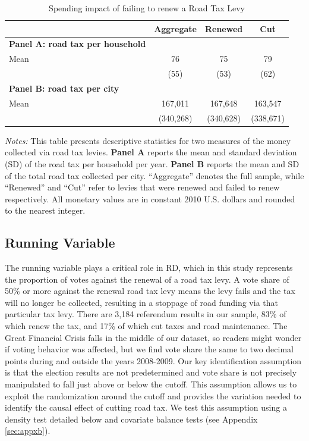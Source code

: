 \begin{table}[H]
    \centering
    \caption{Spending impact of failing to renew a Road Tax Levy}
    \label{tab:levy_stats}
    \begin{threeparttable}
    \begin{tabular}{p{5cm}ccc}
    \hline\hline
    & \textbf{Aggregate} & \textbf{Renewed} & \textbf{Cut} \\
    \hline
    \textbf{Panel A: road tax per household} \\
    Mean & 76 & 75 & 79 \\
       & (55) & (53) & (62) \\
    \hline
    \textbf{Panel B: road tax per city} \\
    Mean & 167,011 & 167,648 & 163,547 \\
       & (340,268) & (340,628) & (338,671) \\
    \hline\hline
    \end{tabular}
    \begin{tablenotes}[flushleft]
      \footnotesize
      \item \textit{Notes:} 
      This table presents descriptive statistics for two measures of the money collected via road tax levies. 
      \textbf{Panel A} reports the mean and standard deviation (SD) of the road tax per household per year. 
      \textbf{Panel B} reports the mean and SD of the total road tax collected per city. 
      “Aggregate” denotes the full sample, while “Renewed” and “Cut” refer to levies that were renewed and failed to renew respectively.
      All monetary values are in constant 2010 U.S. dollars and rounded to the nearest integer.
    \end{tablenotes}
    \end{threeparttable}
\end{table}

\subsection{Running Variable}

The running variable plays a critical role in RD, which in this study represents the proportion of votes against the renewal of a road tax levy. A vote share of 50\% or more against the renewal road tax levy means the levy fails and the tax will no longer be collected, resulting in a stoppage of road funding via that particular tax levy. There are 3,184 referendum results in our sample, 83\% of which renew the tax, and 17\% of which cut taxes and road maintenance. The Great Financial Crisis falls in the middle of our dataset, so readers might wonder if voting behavior was affected, but we find vote share the same to two decimal points during and outside the years 2008-2009. Our key identification assumption is that the election results are not predetermined and vote share is not precisely manipulated to fall just above or below the cutoff. This assumption allows us to exploit the randomization around the cutoff and provides the variation needed to identify the causal effect of cutting road tax. We test this assumption using a density test detailed below and covariate balance tests (see Appendix \ref{sec:appxb}).

